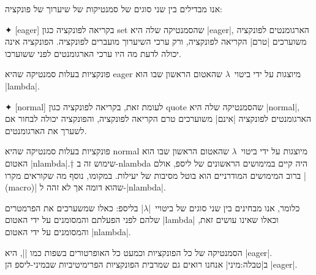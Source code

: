 אנו מבדילים בין שני סוגים של סמנטיקות של שיערוך של פונקציה:
\begin{description}
  ✦ [eager] בקריאה לפונקציה כגון set שהסמנטיקה שלה היא \E|eager|, הארגומנטים
  לפונקציה משוערכים \ע|טרם| הקריאה לפונקציה, ורק ערכי השיערוך מועברים לפונקציה.
  הפונקציה אינה יכולה לדעת מה היו ערכי הארגומנטים לפני ששוערכו.

  פונקציות בעלות סמנטיקה שהיא eager מיוצגות על ידי ביטוי~$λ$ שהאטום הראשון שבו
  הוא \T|lambda|.

  ✦ [normal] לעומת זאת, בקריאה לפונקציה כגון quote שהסמנטיקה שלה היא
  \E|normal|, הארגומנטים לפונקציה \ע|אינם| משוערכים טרם הקריאה לפונקציה,
  והפונקציה יכולה לבחור אם לשערך את הארגומנטים.

  פונקציות בעלות סמנטיקה שהיא normal מיוצגות על ידי ביטוי~$λ$ שהאטום הראשון שבו
  הוא האטום \T|nlambda|.†{%
  שימוש זה ב-nlambda היה קיים במימושים הראשונים של ליספ, אולם ברוב המימושים המודרניים
  הוא בוטל מסיבות של יעילות. במקומו, נוסף מה שקוראים מקרו \E|(macro)|
  שהוא דומה אך לא זהה ל-\E|nlambda|.}

  כלומר, אנו מבחינים בין שני סוגים של ביטויי~\E|$λ$| בליספ: כאלו שמשערכים את
  הפרמטרים שלהם לפני הפעלתם והמסומנים על ידי האטום \T|lambda| וכאלו שאינו עושים
  זאת, והמסומנים על ידי האטום \T|nlambda|.
\end{description}

הסמנטיקה של כל הפונקציות וכמעט כל האופרטורים בשפות כמו \E|\CPL|, היא \E|eager|.
ב|טבלה:מיני| אנחנו רואים גם שמרבית הפונקציות הפרימיטיביות שבמיני-ליספ הן
\E|eager|.

